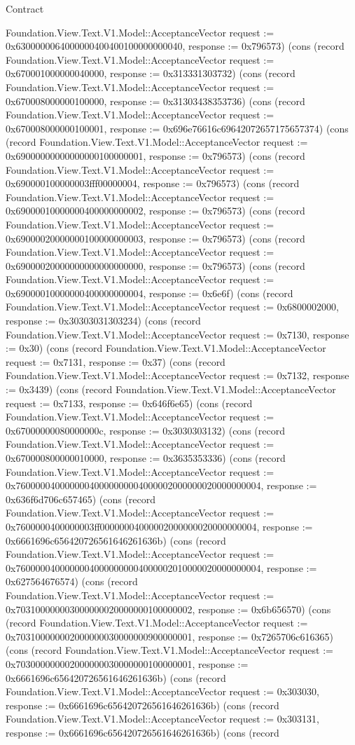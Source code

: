\begin{lexlean}{Contract}
\begin{semanticmodule}
{Foundation.View.Text.V1.Model::AcceptanceVector {request := 0x6300000064000000400400100000000040, response := 0x796573}) (cons (record Foundation.View.Text.V1.Model::AcceptanceVector {request := 0x670001000000040000, response := 0x313331303732}) (cons (record Foundation.View.Text.V1.Model::AcceptanceVector {request := 0x670008000000100000, response := 0x31303438353736}) (cons (record Foundation.View.Text.V1.Model::AcceptanceVector {request := 0x670008000000100001, response := 0x696e76616c69642072657175657374}) (cons (record Foundation.View.Text.V1.Model::AcceptanceVector {request := 0x69000000000000000100000001, response := 0x796573}) (cons (record Foundation.View.Text.V1.Model::AcceptanceVector {request := 0x690000100000003fff00000004, response := 0x796573}) (cons (record Foundation.View.Text.V1.Model::AcceptanceVector {request := 0x69000010000000400000000002, response := 0x796573}) (cons (record Foundation.View.Text.V1.Model::AcceptanceVector {request := 0x69000020000000100000000003, response := 0x796573}) (cons (record Foundation.View.Text.V1.Model::AcceptanceVector {request := 0x69000020000000000000000000, response := 0x796573}) (cons (record Foundation.View.Text.V1.Model::AcceptanceVector {request := 0x69000010000000400000000004, response := 0x6e6f}) (cons (record Foundation.View.Text.V1.Model::AcceptanceVector {request := 0x6800002000, response := 0x30303031303234}) (cons (record Foundation.View.Text.V1.Model::AcceptanceVector {request := 0x7130, response := 0x30}) (cons (record Foundation.View.Text.V1.Model::AcceptanceVector {request := 0x7131, response := 0x37}) (cons (record Foundation.View.Text.V1.Model::AcceptanceVector {request := 0x7132, response := 0x3439}) (cons (record Foundation.View.Text.V1.Model::AcceptanceVector {request := 0x7133, response := 0x646f6e65}) (cons (record Foundation.View.Text.V1.Model::AcceptanceVector {request := 0x67000000080000000c, response := 0x3030303132}) (cons (record Foundation.View.Text.V1.Model::AcceptanceVector {request := 0x670000800000010000, response := 0x3635353336}) (cons (record Foundation.View.Text.V1.Model::AcceptanceVector {request := 0x76000004000000040000000004000002000000020000000004, response := 0x636f6d706c657465}) (cons (record Foundation.View.Text.V1.Model::AcceptanceVector {request := 0x7600000400000003ff00000004000002000000020000000004, response := 0x6661696c656420726561646261636b}) (cons (record Foundation.View.Text.V1.Model::AcceptanceVector {request := 0x76000004000000040000000004000002010000020000000004, response := 0x627564676574}) (cons (record Foundation.View.Text.V1.Model::AcceptanceVector {request := 0x703100000003000000020000000100000002, response := 0x6b656570}) (cons (record Foundation.View.Text.V1.Model::AcceptanceVector {request := 0x703100000002000000030000000900000001, response := 0x7265706c616365}) (cons (record Foundation.View.Text.V1.Model::AcceptanceVector {request := 0x703000000002000000030000000100000001, response := 0x6661696c656420726561646261636b}) (cons (record Foundation.View.Text.V1.Model::AcceptanceVector {request := 0x303030, response := 0x6661696c656420726561646261636b}) (cons (record Foundation.View.Text.V1.Model::AcceptanceVector {request := 0x303131, response := 0x6661696c656420726561646261636b}) (cons (record }
\end{semanticmodule}
\end{lexlean}
